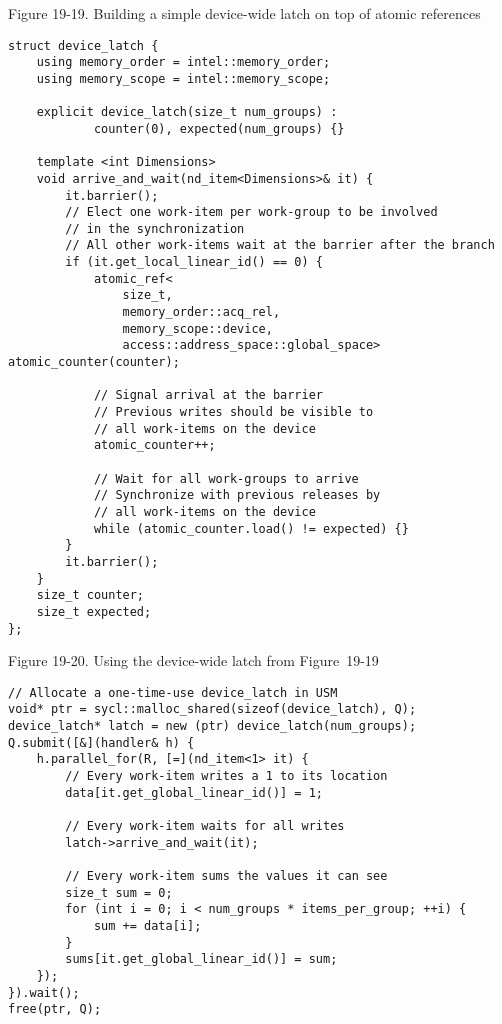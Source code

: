 \hspace*{\fill} \par %
Figure 19-19. Building a simple device-wide latch on top of atomic references
\begin{lstlisting}[caption={}]
struct device_latch {
	using memory_order = intel::memory_order;
	using memory_scope = intel::memory_scope;
	
	explicit device_latch(size_t num_groups) :
			counter(0), expected(num_groups) {}
			
	template <int Dimensions>
	void arrive_and_wait(nd_item<Dimensions>& it) {
		it.barrier();
		// Elect one work-item per work-group to be involved
		// in the synchronization
		// All other work-items wait at the barrier after the branch
		if (it.get_local_linear_id() == 0) {
			atomic_ref<
				size_t,
				memory_order::acq_rel,
				memory_scope::device,
				access::address_space::global_space> atomic_counter(counter);
				
			// Signal arrival at the barrier
			// Previous writes should be visible to 
			// all work-items on the device
			atomic_counter++;
			
			// Wait for all work-groups to arrive
			// Synchronize with previous releases by
			// all work-items on the device
			while (atomic_counter.load() != expected) {}
		}
		it.barrier();
	}
	size_t counter;
	size_t expected;
};
\end{lstlisting}

\hspace*{\fill} \par %
Figure 19-20. Using the device-wide latch from Figure 19-19
\begin{lstlisting}[caption={}]
// Allocate a one-time-use device_latch in USM
void* ptr = sycl::malloc_shared(sizeof(device_latch), Q);
device_latch* latch = new (ptr) device_latch(num_groups);
Q.submit([&](handler& h) {
	h.parallel_for(R, [=](nd_item<1> it) {
		// Every work-item writes a 1 to its location
		data[it.get_global_linear_id()] = 1;
		
		// Every work-item waits for all writes
		latch->arrive_and_wait(it);
		
		// Every work-item sums the values it can see
		size_t sum = 0;
		for (int i = 0; i < num_groups * items_per_group; ++i) {
			sum += data[i];
		}
		sums[it.get_global_linear_id()] = sum;
	});
}).wait();
free(ptr, Q);
\end{lstlisting}

